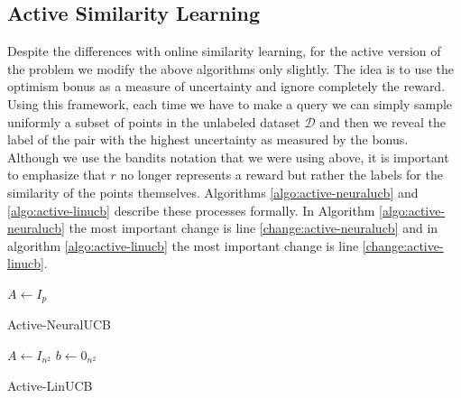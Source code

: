 \documentclass{article}
\begin{document}
  \subsection{Active Similarity Learning}
  Despite the differences with online similarity learning, for the active version of the problem we modify the above algorithms only slightly.
  The idea is to use the optimism bonus as a measure of uncertainty and ignore completely the reward.
  Using this framework, each time we have to make a query we can simply sample uniformly a subset of points in the unlabeled dataset $\mathcal{D}$  and then we reveal the label of the pair with the highest uncertainty as measured by the bonus.
  Although we use the bandits notation that we were using above, it is important to emphasize that $r$ no longer represents a reward but rather the labels for the similarity of the points themselves.
  Algorithms \ref{algo:active-neuralucb} and \ref{algo:active-linucb} describe these processes formally.
  In Algorithm \ref{algo:active-neuralucb} the most important change is line \ref{change:active-neuralucb} and in algorithm
  \ref{algo:active-linucb} the most important change is line \ref{change:active-linucb}.
  \begin{algorithm}
  \label{algo:active-neuralucb}
    $A \gets I_{p}$\;
    \caption{Active-NeuralUCB}
  \end{algorithm}


\begin{algorithm}
  \label{algo:active-linucb}
    $A \gets I_{n^2}$\;
    $b \gets 0_{n^2}$\;
    \caption{Active-LinUCB}
\end{algorithm}
\end{document}
